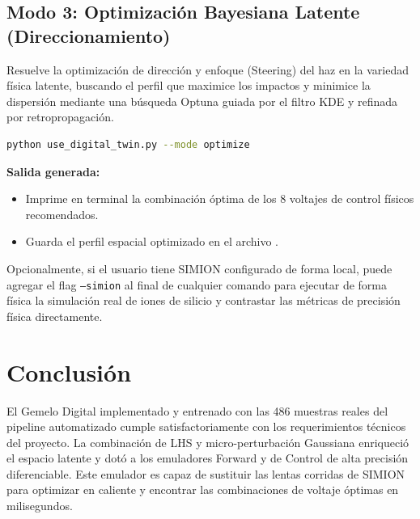 \documentclass[12pt,letterpaper]{article}
\begin{document}
\subsection{Modo 3: Optimización Bayesiana Latente (Direccionamiento)}
Resuelve la optimización de dirección y enfoque (Steering) del haz en la variedad física latente, buscando el perfil que maximice los impactos y minimice la dispersión mediante una búsqueda Optuna guiada por el filtro KDE y refinada por retropropagación.
\begin{lstlisting}[language=bash]
python use_digital_twin.py --mode optimize
\end{lstlisting}
\textbf{Salida generada:}
\begin{itemize}
    \item Imprime en terminal la combinación óptima de los 8 voltajes de control físicos recomendados.
    \item Guarda el perfil espacial optimizado en el archivo .
\end{itemize}

Opcionalmente, si el usuario tiene SIMION configurado de forma local, puede agregar el flag \texttt{--simion} al final de cualquier comando para ejecutar de forma física la simulación real de iones de silicio y contrastar las métricas de precisión física directamente.

\section{Conclusión}
El Gemelo Digital implementado y entrenado con las 486 muestras reales del pipeline automatizado cumple satisfactoriamente con los requerimientos técnicos del proyecto. La combinación de LHS y micro-perturbación Gaussiana enriqueció el espacio latente y dotó a los emuladores Forward y de Control de alta precisión diferenciable. Este emulador es capaz de sustituir las lentas corridas de SIMION para optimizar en caliente y encontrar las combinaciones de voltaje óptimas en milisegundos.
\end{document}
